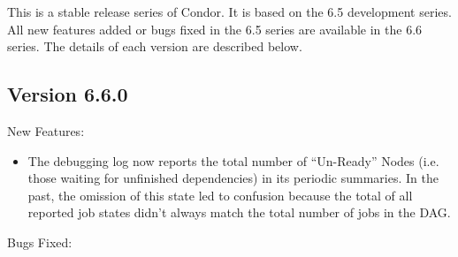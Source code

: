 This is a stable release series of Condor.
It is based on the 6.5 development series.
All new features added or bugs fixed in the 6.5 series are available
in the 6.6 series.
The details of each version are described below.

\subsection{\label{sec:New-6-6-0}Version 6.6.0}

\noindent New Features:

\begin{itemize}

\item The  debugging log now reports the total number
      of ``Un-Ready'' Nodes (i.e. those waiting for unfinished
      dependencies) in its periodic summaries.  In the past, the
      omission of this state led to confusion because the total of all
      reported job states didn't always match the total number of jobs
      in the DAG.

\end{itemize}

\noindent Bugs Fixed:

